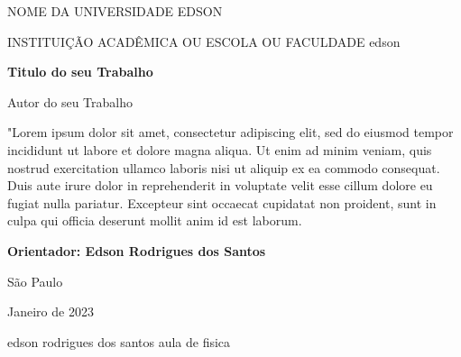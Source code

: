 \documentclass[a4paper,12pt]{article}
\begin{document}
\begin{titlepage}

\addtolength{\topmargin}{1.5cm}

\setlength{\baselineskip}{1.4\baselineskip}

\begin{center}
{\large{NOME DA UNIVERSIDADE EDSON}}

{\large{INSTITUIÇÃO ACADÊMICA OU ESCOLA OU FACULDADE edson}}

\end{center}
\vspace{2cm}
\begin{center}
{\Large\textbf{Titulo do seu Trabalho}}
\end{center}

\vspace{1.5cm}

\begin{center}
{\Large{Autor do seu Trabalho}}
\end{center}

\vspace{2cm}

\begin{flushright}

\begin{minipage}{10cm}

\hrulefill

"Lorem ipsum dolor sit amet, consectetur adipiscing elit, sed do eiusmod tempor incididunt ut labore et dolore magna aliqua. Ut enim ad minim veniam, quis nostrud exercitation ullamco laboris nisi ut aliquip ex ea commodo consequat. Duis aute irure dolor in reprehenderit in voluptate velit esse cillum dolore eu fugiat nulla pariatur. Excepteur sint occaecat cupidatat non proident, sunt in culpa qui officia deserunt mollit anim id est laborum.

\hrulefill

{\textbf{Orientador: Edson Rodrigues dos Santos}}

\end{minipage}
\end{flushright}

\setlength{\baselineskip}{0.7\baselineskip}


\vfill

\begin{center}
São Paulo

Janeiro de 2023
\end{center}



\end{titlepage}

edson rodrigues dos santos aula de fisica
\end{document}
